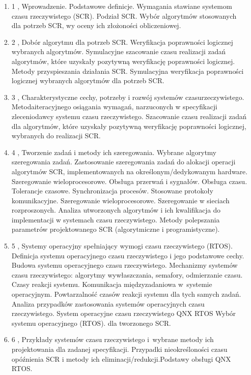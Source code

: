 \documentclass[12pt, a4paper]{article}
\begin{document}
\begin{enumerate}
  \item 1 , Wprowadzenie. Podstawowe definicje. Wymagania stawiane systemom czasu rzeczywistego (SCR). Podział SCR. Wybór algorytmów stosowanych dla potrzeb SCR, wy oceny ich złożoności obliczeniowej.
  \item 2 , Dobór algorytmu dla potrzeb SCR. Weryfikacja poprawności logicznej wybranych algorytmów. Symulacyjne szacowanie czasu realizacji zadań algorytmów, które uzyskały pozytywną weryfikację poprawności logicznej.  Metody przyspieszania działania SCR. Symulacyjna weryfikacja poprawności logicznej wybranych algorytmów dla potrzeb SCR.
  \item 3 , Charakterystyczne cechy, potrzeby i rozwój systemów czasurzeczywistego. Metodaiteracyjnego osiągania wymagań, narzuconych w specyfikacji zleceniodawcy systemu czasu rzeczywistego. Szacowanie czasu realizacji zadań dla algorytmów,  które uzyskały pozytywną weryfikację poprawności logicznej, wybranych do realizacji SCR.
  \item 4 , Tworzenie zadań i metody ich szeregowania. Wybrane algorytmy szeregowania zadań. Zastosowanie szeregowania zadań do alokacji operacji algorytmów SCR, implementowanych na określonym/dedykowanym hardware. Szeregowanie wieloprocesorowe. Obsługa przerwań i sygnałów. Obsługa czasu.  Tolerancje czasowe. Synchronizacja procesów.  Stosowane protokoły komunikacyjne. Szeregowanie wieloprocesorowe. Szeregowanie w sieciach rozproszonych. Analiza utworzonych algorytmów i ich kwalifikacja do implementacji w systemach czasu rzeczywistego. Metody polepszania parametrów projektowanego SCR (algorytmiczne i programistyczne).
  \item 5 , Systemy operacyjny spełniający wymogi czasu rzeczywistego (RTOS).   Definicja systemu operacyjnego czasu rzeczywistego i jego podstawowe cechy. Budowa systemu operacyjnego czasu rzeczywistego. Mechanizmy systemów czasu rzeczywistego: algorytmy wywłaszczania, semafory, odmierzanie czasu. Czasy reakcji systemu. Komunikacja międzyzadaniowa w systemie operacyjnym. Powtarzalność czasów reakcji systemu dla tych samych zadań. Analiza przypadków zastosowania systemów operacyjnych czasu rzeczywistego. System operacyjne czasu rzeczywistego QNX RTOS  Wybór systemu operacyjnego (RTOS).  dla tworzonego SCR.
  \item 6 , Przykłady systemów czasu rzeczywistego i wybrane metody ich projektowania dla zadanej specyfikacji. Przypadki nieokreśloności czasu opóźnienia SCR i metody ich eliminacji/redukcji.Podstawy obsługi QNX RTOS.

\end{enumerate}
\end{document}
